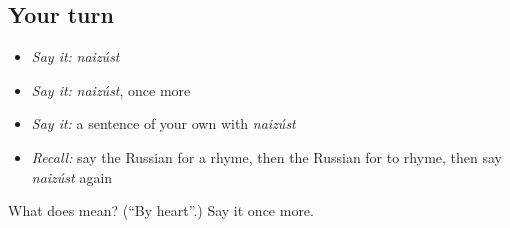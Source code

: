 \subsection*{Your turn}
\begin{itemize}
\raggedright
  \item \emph{Say it:} \emph{naizúst}
  \item \emph{Say it:} \emph{naizúst}, once more
  \item \emph{Say it:} a sentence of your own with \emph{naizúst}
  \item \emph{Recall:} say the Russian for a rhyme, then the Russian for to rhyme, then say \emph{naizúst} again
\end{itemize}

\begin{tcolorbox}[breakable,colback=teal!4,colframe=teal!35!black,title={Before you move on}]
What does  mean? (\textquotedblleft{}By heart\textquotedblright{}.) Say it once more.
\end{tcolorbox}
